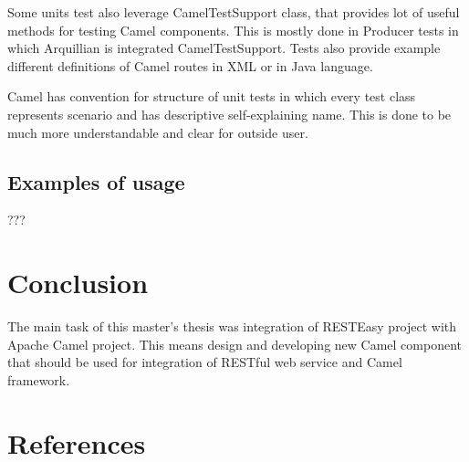 \documentclass[12pt,final,oneside]{fithesis2}
\begin{document}
Some units test also leverage CamelTestSupport class, that provides lot of useful methods for testing Camel components. This is mostly done in Producer tests in which Arquillian is integrated CamelTestSupport. Tests also provide example different definitions of Camel routes in XML or in Java language.

Camel has convention for structure of unit tests in which every test class represents scenario and has descriptive self-explaining name. This is done to be much more understandable and clear for outside user. 

\section{Examples of usage}
???

\chapter{Conclusion}
The main task of this master's thesis was integration of RESTEasy project with Apache Camel project. This means design and developing new Camel component that should be used for integration of RESTful web service and Camel framework. 







\begingroup
\def\tmpchapter{0}
\renewcommand{\chaptername}{}
\renewcommand{\thechapter}{}
\chapter{References}
\renewcommand{\chapter}[2]{}%



\end{document}
